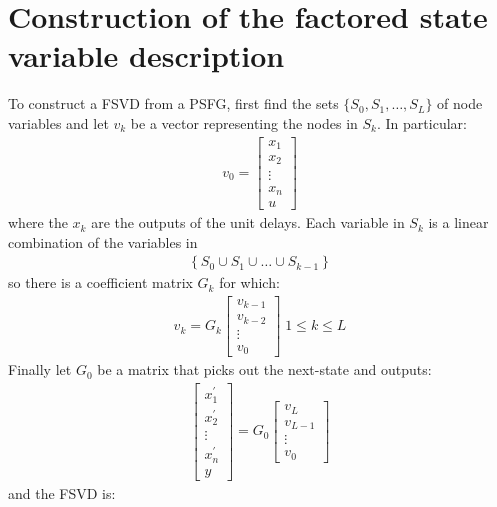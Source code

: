 \documentclass[a4paper,twoside,10pt,english]{report}
\begin{document}
\section{\label{Sec:Construction-factored-state-variable-description}Construction of the factored state variable description}
To construct a FSVD from a PSFG, first find the sets 
$\{S_{0},S_{1},\ldots,S_{L}\}$ of node variables and let $v_{k}$ be a vector
representing the nodes in $S_{k}$. In particular:
\begin{align*}
v_{0} = 
\left[\begin{array}{c}
x_{1}\\
x_{2}\\ 
\vdots\\
x_{n}\\ 
u
\end{array}\right]
\end{align*}
where the $x_{k}$ are the outputs of the unit delays. Each variable in $S_{k}$ 
is a linear combination of the variables in 
\begin{align*}
\left\{S_{0} \cup S_{1} \cup \hdots \cup S_{k-1}\right\}
\end{align*}
so there is a coefficient matrix $G_{k}$ for which:
\begin{align*}
v_{k} = 
G_{k}\left[\begin{array}{c}
v_{k-1}\\
v_{k-2}\\ 
\vdots\\
v_{0}
\end{array}\right]\;1\le{}k\le{}L
\end{align*}
Finally let $G_{0}$ be a matrix that picks out the next-state and outputs:
\begin{align*}
\left[\begin{array}{c}
x^{\prime}_{1}\\
x^{\prime}_{2}\\ 
\vdots\\
x^{\prime}_{n}\\
y
\end{array}\right] = G_{0}
\left[\begin{array}{c}
v_{L}\\
v_{L-1}\\ 
\vdots\\
v_{0}
\end{array}\right]
\end{align*}
and the FSVD is:
\end{document}
